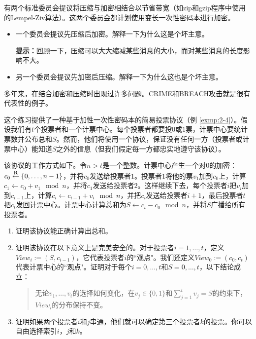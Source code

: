 \begin{exercise}[压缩并加密]
有两个标准委员会提议将压缩与加密相结合以节省带宽（如zip和gzip程序中使用的Lempel-Ziv算法）。这两个委员会都计划使用变长一次性密码本进行加密。
\begin{itemize}
	\item 一个委员会提议先压缩后加密。解释一下为什么这是个坏主意。

	\vspace{1pt}

	\textbf{提示：}回顾一下，压缩可以大大缩减某些消息的大小，而对某些消息的长度影响不大。
	\item 另一个委员会提议先加密后压缩。解释一下为什么这也是个坏主意。
\end{itemize}
多年来，在结合加密和压缩时出现过许多问题。CRIME和BREACH攻击就是很有代表性的例子。
\end{exercise}

\begin{exercise}[投票协议]
这个练习提供了一种基于加性一次性密码本的简易投票协议（例 \ref{exmp:2-4}）。假设我们有$t$个投票者和一个计票中心。每个投票者都要投$0$或$1$票，计票中心要统计票数并公布总和$S$。然而，他们将使用一个协议，保证没有任何一方（投票者或计票中心）能知道$S$之外的信息（但我们假定每一方都忠实地遵守该协议）。

该协议的工作方式如下。令$n>t$是一个整数。计票中心产生一个对$0$的加密：$c_0\overset{\rm R}\leftarrow\{0,\dots,n-1\}$，并将$c_0$发送给投票者$1$。投票者$1$将他的票$v_1$加到$c_0$上，计算$c_1\leftarrow c_0+v_1 \mod n$，并将$c_1$发送给投票者$2$。这样继续下去，每个投票者$i$把$v_i$加到$c_{i-1}$上，计算$c_i\leftarrow c_{i-1}+v_i \mod n$，并把$c_i$发送给投票者$i+1$，最后投票者$t$把$c_t$发回计票中心。计票中心计算总和为$S\leftarrow c_t-c_0 \mod n$，并将$S$广播给所有投票者。
\begin{enumerate}[\indent(a)]
	\item 证明该协议能正确计算出总和。
	\item 证明该协议在以下意义上是完美安全的。对于投票者$i=1,\dots,t$，定义$View_i:=(S,c_{i-1})$，它代表投票者$i$的``观点"。我们还定义$View_0:=(c_0,c_t)$代表计票中心的``观点"。证明对于每个$i=0,\dots,t$和$S=0,\dots,t$，以下结论成立：
	\begin{quote}
		无论$v_1,\dots,v_t$的选择如何变化，在$v_j\in\{0,1\}$和$\sum^t_{j=1}v_j=S$的约束下，$View_i$的分布保持不变。
	\end{quote}
	\item 证明如果两个投票者$i$和$j$串通，他们就可以确定第三个投票者$k$的投票。你可以自由选择索引$i$，$j$和$k$。
\end{enumerate}
\end{exercise}

